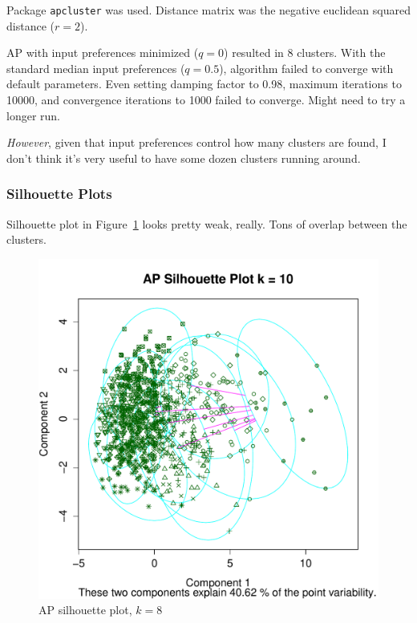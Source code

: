 \documentclass[letterpaper,12pt]{article}
\begin{document}
Package \texttt{apcluster} was used. Distance matrix was the negative euclidean
squared distance ($r = 2$).

AP with input preferences minimized ($q = 0$) resulted in 8 clusters.
With the standard median input preferences ($q = 0.5$), algorithm failed to
converge with default parameters. Even setting damping factor to 0.98, maximum
iterations to 10000, and convergence iterations to 1000 failed to converge.
Might need to try a longer run.

\emph{However}, given that input preferences control how many clusters are
found, I don't think it's very useful to have some dozen clusters running
around.

\subsubsection{Silhouette Plots}

Silhouette plot in Figure~\ref{fig:ap-silhouette} looks pretty weak, really.
Tons of overlap between the clusters.

\begin{figure}[h]
  \centering
  \includegraphics[width=\linewidth]{ap-silhouette.pdf}
  \caption{AP silhouette plot, $k = 8$}
  \label{fig:ap-silhouette}
\end{figure}
\end{document}
